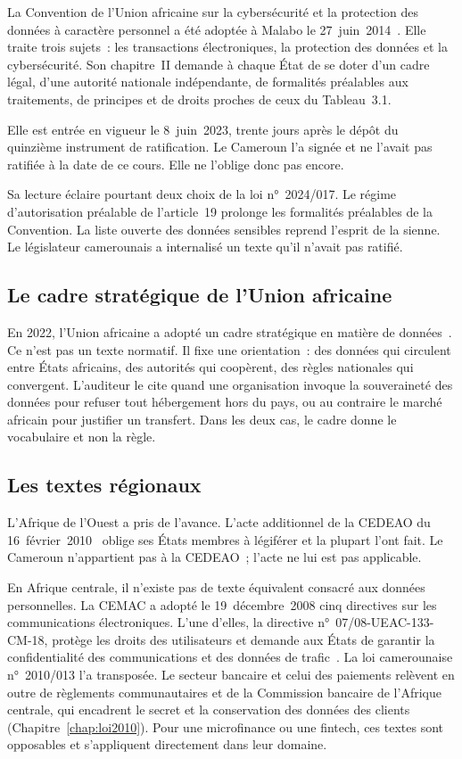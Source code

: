 La Convention de l'Union africaine sur la cybersécurité et la protection des
données à caractère personnel a été adoptée à Malabo le
27~juin~2014~\cite{ua2014malabo}. Elle traite trois sujets~: les transactions
électroniques, la protection des données et la cybersécurité. Son chapitre~II
demande à chaque État de se doter d'un cadre légal, d'une autorité nationale
indépendante, de formalités préalables aux traitements, de principes et de
droits proches de ceux du Tableau~3.1.

Elle est entrée en vigueur le 8~juin~2023, trente jours après le dépôt du
quinzième instrument de ratification. Le Cameroun l'a signée et ne l'avait
pas ratifiée à la date de ce cours. Elle ne l'oblige donc pas encore.

Sa lecture éclaire pourtant deux choix de la loi n°~2024/017. Le régime
d'autorisation préalable de l'article~19 prolonge les formalités préalables
de la Convention. La liste ouverte des données sensibles reprend l'esprit de
la sienne. Le législateur camerounais a internalisé un texte qu'il n'avait
pas ratifié.

\subsection{Le cadre stratégique de l'Union africaine}

En 2022, l'Union africaine a adopté un cadre stratégique en matière de
données~\cite{ua2022donnees}. Ce n'est pas un texte normatif. Il fixe une
orientation~: des données qui circulent entre États africains, des autorités
qui coopèrent, des règles nationales qui convergent. L'auditeur le cite
quand une organisation invoque la souveraineté des données pour refuser tout
hébergement hors du pays, ou au contraire le marché africain pour justifier
un transfert. Dans les deux cas, le cadre donne le vocabulaire et non la
règle.

\subsection{Les textes régionaux}

L'Afrique de l'Ouest a pris de l'avance. L'acte additionnel de la CEDEAO du
16~février~2010~\cite{cedeao2010acte} oblige ses États membres à légiférer
et la plupart l'ont fait. Le Cameroun n'appartient pas à la CEDEAO~; l'acte
ne lui est pas applicable.

En Afrique centrale, il n'existe pas de texte équivalent consacré aux
données personnelles. La CEMAC a adopté le 19~décembre~2008 cinq directives sur les
communications électroniques. L'une d'elles, la directive
n°~07/08-UEAC-133-CM-18, protège les droits des utilisateurs et demande aux
États de garantir la confidentialité des communications et des données de
trafic~\cite{cemac2008}. La loi camerounaise n°~2010/013 l'a transposée. Le secteur bancaire et celui des paiements
relèvent en outre de règlements communautaires et de la Commission bancaire
de l'Afrique centrale, qui encadrent le secret et la conservation des
données des clients (Chapitre~\ref{chap:loi2010}). Pour une microfinance ou
une fintech, ces textes sont opposables et s'appliquent directement dans
leur domaine.

